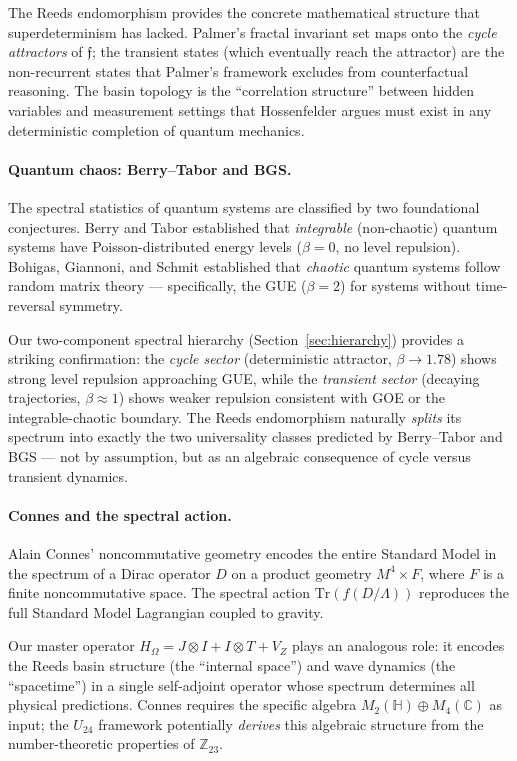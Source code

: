 \documentclass[12pt,a4paper]{article}
\theoremstyle{definition}
\theoremstyle{remark}
\newcommand{\Reeds}{\mathfrak{f}}
\newcommand{\Zp}{\mathbb{Z}_{23}}
\newcommand{\Jcoup}{J}
\newcommand{\HOmega}{H_\Omega}
\begin{document}
The Reeds endomorphism provides the concrete mathematical structure that
superdeterminism has lacked. Palmer's fractal invariant set maps onto the
\emph{cycle attractors} of $\Reeds$; the transient states (which eventually
reach the attractor) are the non-recurrent states that Palmer's framework
excludes from counterfactual reasoning. The basin topology is the
``correlation structure'' between hidden variables and measurement settings that
Hossenfelder argues must exist in any deterministic completion of quantum
mechanics.

\paragraph{Quantum chaos: Berry--Tabor and BGS.}
The spectral statistics of quantum systems are classified by two foundational
conjectures. Berry and Tabor \cite{berry_tabor1977} established that
\emph{integrable} (non-chaotic) quantum systems have Poisson-distributed energy
levels ($\beta = 0$, no level repulsion). Bohigas, Giannoni, and Schmit
\cite{bgs1984} established that \emph{chaotic} quantum systems follow random
matrix theory --- specifically, the GUE ($\beta = 2$) for systems without
time-reversal symmetry.

Our two-component spectral hierarchy (Section~\ref{sec:hierarchy}) provides a
striking confirmation: the \emph{cycle sector} (deterministic attractor,
$\beta \to 1.78$) shows strong level repulsion approaching GUE, while the
\emph{transient sector} (decaying trajectories, $\beta \approx 1$) shows weaker
repulsion consistent with GOE or the integrable-chaotic boundary. The Reeds
endomorphism naturally \emph{splits} its spectrum into exactly the two
universality classes predicted by Berry--Tabor and BGS --- not by assumption, but
as an algebraic consequence of cycle versus transient dynamics.

\paragraph{Connes and the spectral action.}
Alain Connes' noncommutative geometry \cite{connes1994, connes_chamseddine1997}
encodes the entire Standard Model in the spectrum of a Dirac operator $D$ on a
product geometry $M^4 \times F$, where $F$ is a finite noncommutative space.
The spectral action $\mathrm{Tr}(f(D/\Lambda))$ reproduces the full Standard
Model Lagrangian coupled to gravity.

Our master operator $\HOmega = \Jcoup \otimes I + I \otimes T + V_Z$ plays an
analogous role: it encodes the Reeds basin structure (the ``internal space'') and
wave dynamics (the ``spacetime'') in a single self-adjoint operator whose
spectrum determines all physical predictions. Connes requires the specific
algebra $M_2(\mathbb{H}) \oplus M_4(\mathbb{C})$ as input; the $U_{24}$
framework potentially \emph{derives} this algebraic structure from the
number-theoretic properties of $\Zp$.
\end{document}
